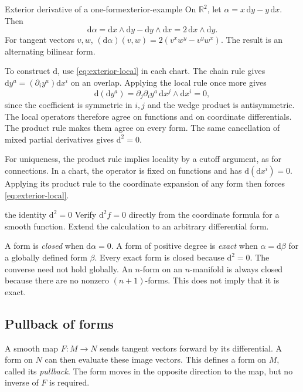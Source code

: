 \documentclass[11pt,a4paper]{article}
\numberwithin{equation}{section}
\newcommand{\R}{\mathbb R}
\newcommand{\dd}{\mathrm d}
\begin{document}
\begin{examplebox}{Exterior derivative of a one-form}{exterior-example}
On \(\R^2\), let \(\alpha=x\,\dd y-y\,\dd x\). Then
\[
 \dd\alpha=\dd x\wedge\dd y-\dd y\wedge\dd x
           =2\,\dd x\wedge\dd y.
\]
For tangent vectors \(v,w\),
\((\dd\alpha)(v,w)=2(v^xw^y-v^yw^x)\). The result is an
alternating bilinear form.
\end{examplebox}

To construct \(\dd\), use \eqref{eq:exterior-local} in each chart.
The chain rule gives \(\dd y^a=(\partial_i y^a)\dd x^i\) on an
overlap. Applying the local rule once more gives
\[
 \dd(\dd y^a)
 =\partial_j\partial_i y^a\,\dd x^j\wedge\dd x^i=0,
\]
since the coefficient is symmetric in \(i,j\) and the wedge product
is antisymmetric. The local operators therefore agree on functions and
on coordinate differentials. The product rule makes them agree on every
form. The same cancellation of mixed partial derivatives gives
\(\dd^2=0\).

For uniqueness, the product rule implies locality by a cutoff argument,
as for connections. In a chart, the operator is fixed on functions and
has \(\dd(\dd x^i)=0\). Applying its product rule to the coordinate
expansion of any form then forces \eqref{eq:exterior-local}.

\begin{studentwork}[3.3cm]{the identity \(\dd^2=0\)}
Verify \(\dd^2f=0\) directly from the coordinate formula for a smooth
function. Extend the calculation to an arbitrary differential form.
\end{studentwork}

A form is \emph{closed} when \(\dd\alpha=0\). A form of positive
degree is \emph{exact} when \(\alpha=\dd\beta\) for a globally defined
form \(\beta\). Every exact form is closed because \(\dd^2=0\).
The converse need not hold globally. An \(n\)-form on an
\(n\)-manifold is always closed because there are no nonzero
\((n+1)\)-forms. This does not imply that it is exact.

\subsection{Pullback of forms}

A smooth map \(F:M\to N\) sends tangent vectors forward by its
differential. A form on \(N\) can then evaluate these image vectors.
This defines a form on \(M\), called its \emph{pullback}. The form
moves in the opposite direction to the map, but no inverse of \(F\)
is required.
\end{document}
